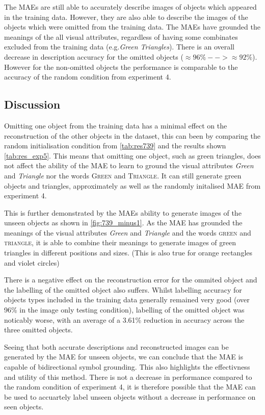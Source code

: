 The \acp{MAE} are still able to accurately describe images of objects which appeared in the training data. However, they are also able to describe the images of the objects which were omitted from the training data. The \acp{MAE} have grounded the meanings of the all visual attributes, regardless of having some combinates excluded from the training data (e.g.\textit{Green Triangles}). There is an overall decrease in description accuracy for the omitted objects ($\approx 96 \% --> \approx 92 \%$). However for the non-omitted objects the performance is comparable to the accuracy of the random condition from experiment 4.

\subsection{Discussion}
Omitting one object from the training data has a minimal effect on the reconstruction of the other objects in the dataset, this can been by comparing the random initialisation condition from \autoref{tab:res739} and the results shown \autoref{tab:res_exp5}. This means that omitting one object, such as green triangles, does not affect the ability of the \ac{MAE} to learn to ground the visual attributes \textit{Green} and \textit{Triangle} nor the words \textsc{Green} and \textsc{Triangle}. It can still generate green objects and triangles, approximately as well as the randomly initalised MAE from experiment 4.

This is further demonstrated by the \acp{MAE} ability to generate images of the unseen objects as shown in \autoref{fig:739_minus1}. As the \ac{MAE} has grounded the meanings of the visual attributes \textit{Green} and \textit{Triangle} and the words \textsc{green} and \textsc{triangle}, it is able to combine their meanings to generate images of green triangles in different positions and sizes. (This is also true for orange rectangles and violet circles)

There is a negative effect on the reconstruction error for the ommited object and the labelling of the omitted object also suffers. Whilst labelling accuracy for objects types included in the training data generally remained very good (over 96\% in the image only testing condition), labelling of the omitted object was noticably worse, with an average of a 3.61\% reduction in accuracy across the three omitted objects.

Seeing that both accurate descriptions and reconstructed images can be generated by the \ac{MAE} for unseen objects, we can conclude that the \ac{MAE} is capable of bidirectional symbol grounding. This also highlights the effectivness and utility of this method. There is not a decrease in performance compared to the random condition of experiment 4, it is therefore possible that the \ac{MAE} can be used to accuartely label unseen objects without a decrease in performance on seen objects.


